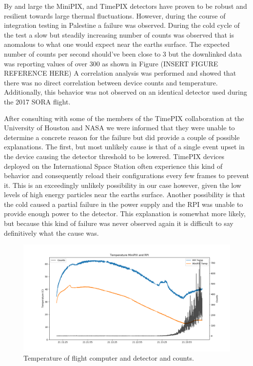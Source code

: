 By and large the MiniPIX, and TimePIX detectors have proven to be robust and resilient towards large thermal fluctuations. However, during the course of integration testing in Palestine a failure was observed. During the cold cycle of the test a slow but steadily increasing number of counts was observed that is anomalous to what one would expect near the earths surface. The expected number of counts per second should've been close to 3 but the downlinked data was reporting values of over 300 as shown in Figure (INSERT FIGURE REFERENCE HERE)
A correlation analysis was performed and showed that there was no direct correlation between device counts and temperature. Additionally, this behavior was not observed on an identical detector used during the 2017 SORA flight. 

After consulting with some of the members of the TimePIX collaboration at the University of Houston and NASA we were informed that they were unable to determine a concrete reason for the failure but did provide a couple of possible explanations. The first, but most unlikely cause is that of a single event upset in the device causing the detector threshold to be lowered. TimePIX devices deployed on the International Space Station often experience this kind of behavior and consequently reload their configurations every few frames to prevent it. This is an exceedingly unlikely possibility in our case however, given the low levels of high energy particles near the earths surface. Another possibility is that the cold caused a partial failure in the power supply and the RPI was unable to provide enough power to the detector. This explanation is somewhat more likely, but because this kind of failure was never observed again it is difficult to say definitively what the cause was.

\begin{figure}[h!]
	\begin{center}
	\includegraphics[width=\textwidth]{figures/tempsandcountsvtime.png}
	\caption{Temperature of flight computer and detector and counts.}
	\label{integrationtemps}
	\end{center}
\end{figure}

